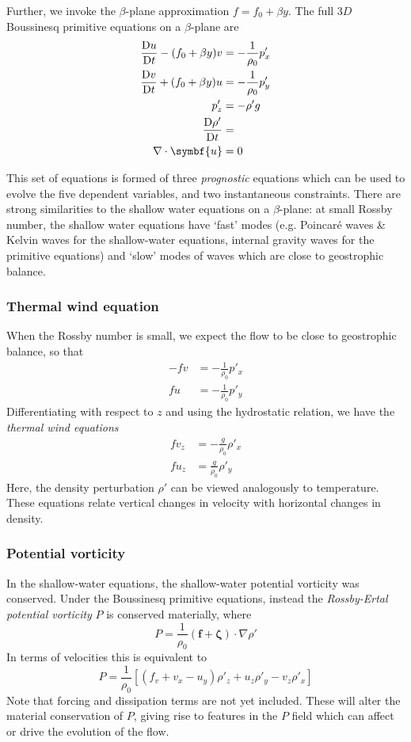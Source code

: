 \documentclass{jknotes}
\begin{document}
Further, we invoke the $\beta$-plane approximation $f = f_0 + \beta y$. The
full $3D$ Boussinesq primitive equations on a $\beta$-plane are
\begin{align}
	\frac{\diffD u}{\diffD t} - (f_0+\beta y)v &= -\frac{1}{\rho_0} p'_x \\
	\frac{\diffD v}{\diffD t} + (f_0 + \beta y) u &= -\frac{1}{\rho_0} p'_y \\
	p'_z &= -\rho' g \\
	\frac{\diffD \rho'}{\diffD t} &= \\
	\nabla \cdot \symbf{u} &= 0
\end{align}

This set of equations is formed of three \emph{prognostic} equations which can
be used to evolve the five dependent variables, and two instantaneous
constraints. There are strong similarities to the shallow water equations on a
$\beta$-plane: at small Rossby number, the shallow water equations have
`fast' modes (e.g. Poincar\'{e} waves \& Kelvin waves for the shallow-water
equations, internal gravity waves for the primitive equations) and `slow'
modes of waves which are close to geostrophic balance.

\subsubsection{Thermal wind equation}
When the Rossby number is small, we expect the flow to be close to geostrophic
balance, so that
\begin{align}
	-fv &= -\frac{1}{\rho_0} p'_x \\
	fu &= -\frac{1}{\rho_0} p'_y
\end{align}
Differentiating with respect to $z$ and using the hydrostatic relation, we
have the \emph{thermal wind equations}
\begin{align}
	fv_z &= -\frac{g}{\rho_0} \rho'_x \\
	fu_z &= \frac{g}{\rho_0} \rho'_y
\end{align}
Here, the density perturbation $\rho'$ can be viewed analogously to
temperature. These equations relate vertical changes in velocity with
horizontal changes in density.

\subsubsection{Potential vorticity}
In the shallow-water equations, the shallow-water potential vorticity was
conserved. Under the Boussinesq primitive equations, instead the
\emph{Rossby-Ertal potential vorticity} $P$ is conserved materially, where
\begin{equation}
	P = \frac{1}{\rho_0} (\symbf{f} +\symbf{\zeta})\cdot \nabla \rho'
\end{equation}
In terms of velocities this is equivalent to
\begin{equation}
	P = \frac{1}{\rho_0} \left[ (f_v + v_x - u_y) \rho'_z + u_z \rho'_y -
		v_z
	\rho'_x\right]
\end{equation}
Note that forcing and dissipation terms are not yet included. These will alter
the material conservation of $P$, giving rise to features in the $P$ field
which can affect or drive the evolution of the flow.
\end{document}
